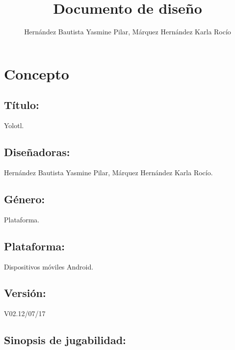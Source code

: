 \documentclass[11pt,letterpaper]{article}
\begin{document}
	\author{Hernández Bautista Yasmine Pilar, Márquez 		Hernández Karla Rocío}
	\title{Documento de diseño}
	\maketitle
	\tableofcontents
	
	\section{Concepto}
		\subsection{Título:} Yolotl.
		\subsection{Diseñadoras:} Hernández Bautista 				Yasmine Pilar, Márquez Hernández Karla Rocío.
    	\subsection{Género:} Plataforma.
   		\subsection{Plataforma:} Dispositivos móviles 				Android.
    	\subsection{Versión:} V02.12/07/17
   		\subsection{Sinopsis de jugabilidad:} 
   		
\end{document}
